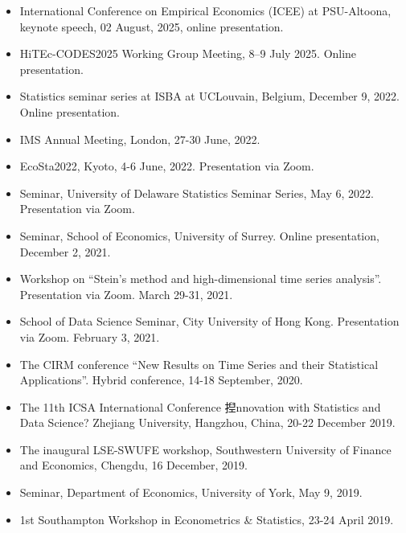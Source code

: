\documentclass[overlapped,line,letterpaper]{res}
\begin{document}
\begin{resume}
\begin{itemize}
\item[$\bullet$] International Conference on Empirical Economics (ICEE) at PSU-Altoona, keynote speech, 02 August, 2025, online presentation.

\item[$\bullet$] HiTEc-CODES2025 Working Group Meeting, 8–9 July 2025. Online presentation.

\item[$\bullet$] Statistics seminar series at ISBA at UCLouvain, Belgium, December 9, 2022. Online presentation.

\item[$\bullet$] IMS Annual Meeting, London, 27-30 June, 2022.

\item[$\bullet$] EcoSta2022, Kyoto, 4-6 June, 2022. Presentation via Zoom.

\item[$\bullet$] Seminar, University of Delaware Statistics Seminar Series, May 6, 2022. Presentation via Zoom.

\item[$\bullet$] Seminar, School of Economics, University of Surrey. Online presentation, December 2, 2021.

\item[$\bullet$] Workshop on ``Stein's method and high-dimensional time series analysis''. Presentation via Zoom. March 29-31, 2021.

\item[$\bullet$] School of Data Science Seminar, City University of Hong Kong. Presentation via Zoom. February 3, 2021.

\item[$\bullet$] The CIRM conference ``New Results on Time Series and their Statistical Applications''. Hybrid conference, 14-18 September, 2020.

\item[$\bullet$] The 11th ICSA International Conference 揑nnovation with Statistics and Data Science? Zhejiang University, Hangzhou, China,  20-22 December 2019.

\item[$\bullet$] The inaugural LSE-SWUFE workshop, Southwestern University of Finance and Economics, Chengdu, 16 December, 2019.


\item[$\bullet$] Seminar, Department of Economics, University of York, May 9, 2019.

\item[$\bullet$] 1st Southampton Workshop in Econometrics \& Statistics,
23-24 April 2019.


\end{itemize}
\end{resume}
\end{document}
